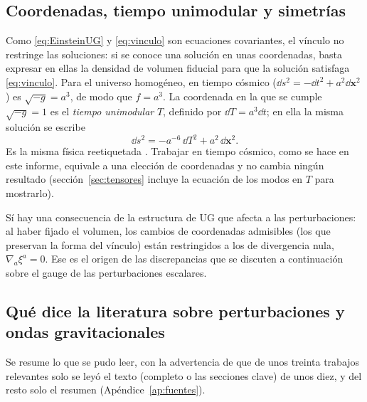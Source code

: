 \subsection{Coordenadas, tiempo unimodular y simetrías}

Como \eqref{eq:EinsteinUG} y \eqref{eq:vinculo} son ecuaciones covariantes, el vínculo no restringe las soluciones: si se conoce una solución en unas coordenadas, basta expresar en ellas la densidad de volumen fiducial para que la solución satisfaga \eqref{eq:vinculo}. Para el universo homogéneo, en tiempo cósmico ($\dd s^2=-\dd t^2+a^2\dd\mathbf x^2$) es $\sqrt{-g}=a^3$, de modo que $f=a^3$. La coordenada en la que se cumple $\sqrt{-g}=1$ es el \emph{tiempo unimodular} $T$, definido por $\dd T=a^3\dd t$; en ella la misma solución se escribe
\begin{equation}
\dd s^2=-a^{-6}\,\dd T^2+a^2\,\dd\mathbf x^2.
\label{eq:metricaT}
\end{equation}
Es la misma física reetiquetada \cite{bengochea23}. Trabajar en tiempo cósmico, como se hace en este informe, equivale a una elección de coordenadas y no cambia ningún resultado (sección~\ref{sec:tensores} incluye la ecuación de los modos en $T$ para mostrarlo).

Sí hay una consecuencia de la estructura de UG que afecta a las perturbaciones: al haber fijado el volumen, los cambios de coordenadas admisibles (los que preservan la forma del vínculo) están restringidos a los de divergencia nula, $\nabla_a\xi^a=0$. Ese es el origen de las discrepancias que se discuten a continuación sobre el gauge de las perturbaciones escalares.

\subsection{Qué dice la literatura sobre perturbaciones y ondas gravitacionales}
\label{sec:ug-literatura}

Se resume lo que se pudo leer, con la advertencia de que de unos treinta trabajos relevantes solo se leyó el texto (completo o las secciones clave) de unos diez, y del resto solo el resumen (Apéndice~\ref{ap:fuentes}).

